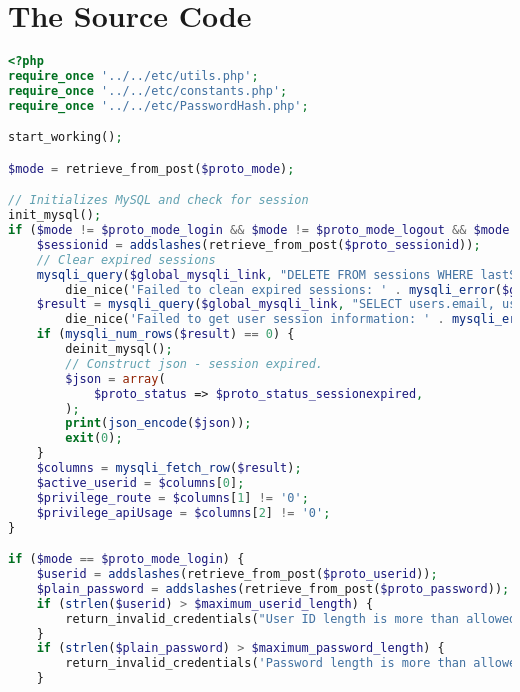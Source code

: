 \chapter{The Source Code}
\label{app:A}

\singlespacing 
%
%
\begin{lstlisting}[language=PHP,basicstyle=\tiny,caption=handle.php,label={lst:handle.php}]
<?php
require_once '../../etc/utils.php';
require_once '../../etc/constants.php';
require_once '../../etc/PasswordHash.php';

start_working();

$mode = retrieve_from_post($proto_mode);

// Initializes MySQL and check for session
init_mysql();
if ($mode != $proto_mode_login && $mode != $proto_mode_logout && $mode != $proto_mode_register) {
	$sessionid = addslashes(retrieve_from_post($proto_sessionid));
	// Clear expired sessions
	mysqli_query($global_mysqli_link, "DELETE FROM sessions WHERE lastSeen < (NOW() - INTERVAL $session_expiry_interval_mysql)") or
		die_nice('Failed to clean expired sessions: ' . mysqli_error($global_mysqli_link), true);
	$result = mysqli_query($global_mysqli_link, "SELECT users.email, users.privilegeRoute, users.privilegeApiUsage FROM users LEFT JOIN sessions ON users.email = sessions.email WHERE sessions.sessionId = '$sessionid'") or
		die_nice('Failed to get user session information: ' . mysqli_error($global_mysqli_link), true);
	if (mysqli_num_rows($result) == 0) {
		deinit_mysql();
		// Construct json - session expired.
		$json = array(
			$proto_status => $proto_status_sessionexpired,
		);
		print(json_encode($json));
		exit(0);
	}
	$columns = mysqli_fetch_row($result);
	$active_userid = $columns[0]; 
	$privilege_route = $columns[1] != '0';
	$privilege_apiUsage = $columns[2] != '0';
}

if ($mode == $proto_mode_login) {
	$userid = addslashes(retrieve_from_post($proto_userid));
	$plain_password = addslashes(retrieve_from_post($proto_password));
	if (strlen($userid) > $maximum_userid_length) {
		return_invalid_credentials("User ID length is more than allowed (". strlen($userid) . ')');
	}
	if (strlen($plain_password) > $maximum_password_length) {
		return_invalid_credentials('Password length is more than allowed ('. strlen($password) . ')');
	}


\end{lstlisting}
